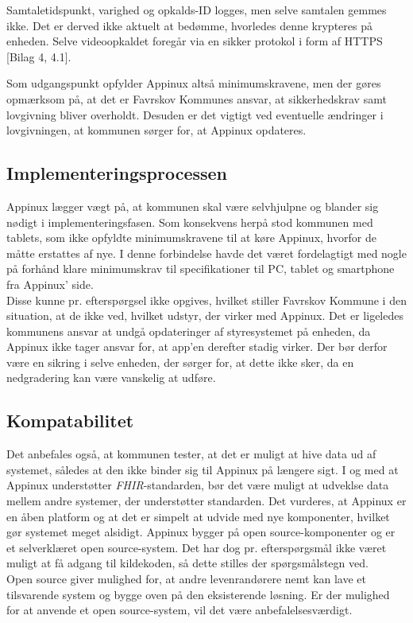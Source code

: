 Samtaletidspunkt, varighed og opkalds-ID logges, men selve samtalen gemmes ikke. Det er derved ikke aktuelt at bedømme, hvorledes denne krypteres på enheden. Selve videoopkaldet foregår via en sikker protokol i form af HTTPS [Bilag 4, 4.1].

Som udgangspunkt opfylder Appinux altså minimumskravene, men der gøres opmærksom på, at det er Favrskov Kommunes ansvar, at sikkerhedskrav samt lovgivning bliver overholdt. Desuden er det vigtigt ved eventuelle ændringer i lovgivningen, at kommunen sørger for, at Appinux opdateres.

\subsection{Implementeringsprocessen}
\label{sec:implementeringsprocessen}
Appinux lægger vægt på, at kommunen skal være selvhjulpne og blander sig nødigt i implementeringsfasen. Som konsekvens herpå stod kommunen med tablets, som ikke opfyldte minimumskravene til at køre Appinux, hvorfor de måtte erstattes af nye. I denne forbindelse havde det været fordelagtigt med nogle på forhånd klare minimumskrav til specifikationer til PC, tablet og smartphone fra Appinux' side.\\Disse kunne pr. efterspørgsel ikke opgives, hvilket stiller Favrskov Kommune i den situation, at de ikke ved, hvilket udstyr, der virker med Appinux. Det er ligeledes kommunens ansvar at undgå opdateringer af styresystemet på enheden, da Appinux ikke tager ansvar for, at app'en derefter stadig virker. Der bør derfor være en sikring i selve enheden, der sørger for, at dette ikke sker, da en nedgradering kan være vanskelig at udføre.
\subsection{Kompatabilitet}
Det anbefales også, at kommunen tester, at det er muligt at hive data ud af systemet, således at den ikke binder sig til Appinux på længere sigt. I og med at Appinux understøtter \textit{FHIR}-standarden, bør det være muligt at udveklse data mellem andre systemer, der understøtter standarden. Det vurderes, at Appinux er en åben platform og at det er simpelt at udvide med nye komponenter, hvilket gør systemet meget alsidigt. Appinux bygger på open source-komponenter og er et selverklæret open source-system. Det har dog pr. efterspørgsmål ikke været muligt at få adgang til kildekoden, så dette stilles der spørgsmålstegn ved.\\Open source giver mulighed for, at andre levenrandørere nemt kan lave et tilsvarende system og bygge oven på den eksisterende løsning. Er der mulighed for at anvende et open source-system, vil det være anbefalelsesværdigt.

